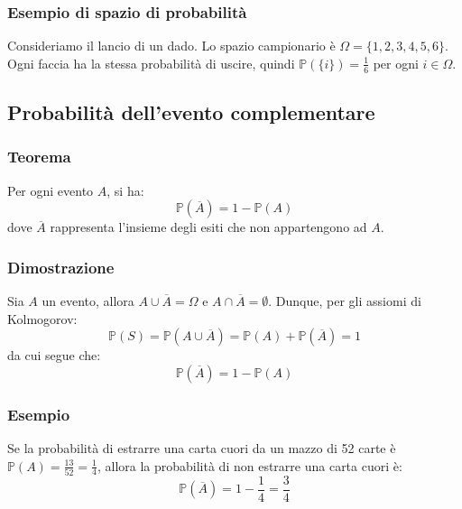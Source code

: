 \documentclass{article}
\begin{document}
\subsubsection{Esempio di spazio di probabilità}
Consideriamo il lancio di un dado. Lo spazio campionario è \(\Omega = \{1, 2, 3, 4, 5, 6\}\).
Ogni faccia ha la stessa probabilità di uscire, quindi \(\mathbb{P}(\{i\}) = \frac{1}{6}\)
per ogni \(i \in \Omega\).

\newpage
\subsection{Probabilità dell'evento complementare}

\subsubsection{Teorema}
Per ogni evento \(A\), si ha:
\[
\mathbb{P}(\overline{A}) = 1 - \mathbb{P}(A)
\]
dove \(\overline{A}\) rappresenta l'insieme degli esiti che non appartengono ad \(A\).

\subsubsection{Dimostrazione}
Sia \(A\) un evento, allora \(A \cup \overline{A} = \Omega\) e \(A \cap \overline{A} = \emptyset\). Dunque, per gli assiomi di Kolmogorov:
\[
    \mathbb{P}(S) = \mathbb{P}(A \cup \overline{A}) = \mathbb{P}(A) + \mathbb{P}(\overline{A}) = 1
\]
da cui segue che:
\[
    \mathbb{P}(\overline{A}) = 1 - \mathbb{P}(A)
\]

\subsubsection{Esempio}
Se la probabilità di estrarre una carta cuori da un mazzo di 52 carte è \(\mathbb{P}(A) = \frac{13}{52} = \frac{1}{4}\), allora la probabilità di non estrarre una carta cuori è:
\[
    \mathbb{P}(\overline{A}) = 1 - \frac{1}{4} = \frac{3}{4}
\]

\begin{figure}[ht!]
\begin{center}
\end{center}
\end{figure}
\end{document}
